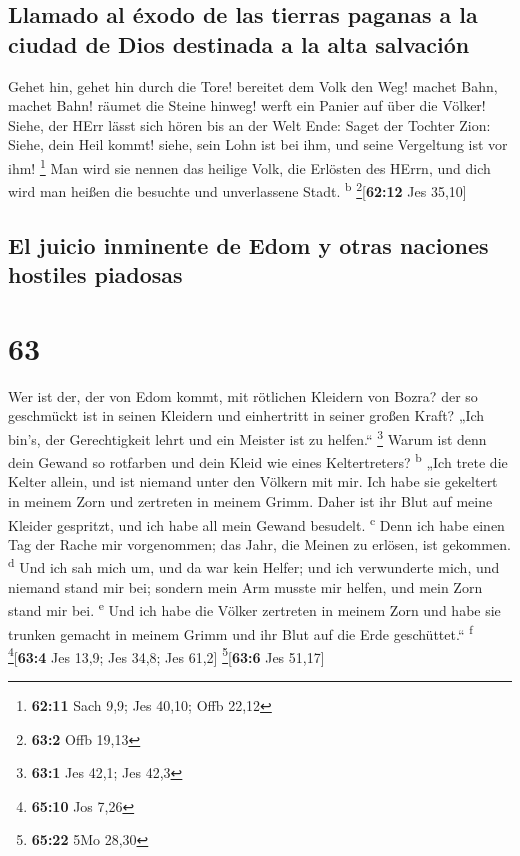 \hypertarget{llamado-al-uxe9xodo-de-las-tierras-paganas-a-la-ciudad-de-dios-destinada-a-la-alta-salvaciuxf3n}{%
\subsection{Llamado al éxodo de las tierras paganas a la ciudad de Dios
destinada a la alta
salvación}\label{llamado-al-uxe9xodo-de-las-tierras-paganas-a-la-ciudad-de-dios-destinada-a-la-alta-salvaciuxf3n}}

 Gehet hin, gehet hin durch die Tore! bereitet dem Volk
den Weg! machet Bahn, machet Bahn! räumet die Steine hinweg! werft ein
Panier auf über die Völker!  Siehe, der HErr lässt sich
hören bis an der Welt Ende: Saget der Tochter Zion: Siehe, dein Heil
kommt! siehe, sein Lohn ist bei ihm, und seine Vergeltung ist vor ihm!
\footnote{\textbf{62:11} Sach 9,9; Jes 40,10; Offb 22,12}
 Man wird sie nennen das heilige Volk, die Erlösten des
HErrn, und dich wird man heißen die besuchte und unverlassene Stadt.
\textsuperscript{b} \footnote{\textbf{63:2} Offb 19,13}{[}\textbf{62:12}
Jes 35,10{]}

\hypertarget{el-juicio-inminente-de-edom-y-otras-naciones-hostiles-piadosas}{%
\subsection{El juicio inminente de Edom y otras naciones hostiles
piadosas}\label{el-juicio-inminente-de-edom-y-otras-naciones-hostiles-piadosas}}

\hypertarget{section-62}{%
\section{63}\label{section-62}}

 Wer ist der, der von Edom kommt, mit rötlichen Kleidern
von Bozra? der so geschmückt ist in seinen Kleidern und einhertritt in
seiner großen Kraft? „Ich bin's, der Gerechtigkeit lehrt und ein Meister
ist zu helfen.`` \footnote{\textbf{63:1} Jes 42,1; Jes 42,3}
 Warum ist denn dein Gewand so rotfarben und dein Kleid
wie eines Keltertreters? \textsuperscript{b}  „Ich trete
die Kelter allein, und ist niemand unter den Völkern mit mir. Ich habe
sie gekeltert in meinem Zorn und zertreten in meinem Grimm. Daher ist
ihr Blut auf meine Kleider gespritzt, und ich habe all mein Gewand
besudelt. \textsuperscript{c}  Denn ich habe einen Tag der
Rache mir vorgenommen; das Jahr, die Meinen zu erlösen, ist gekommen.
\textsuperscript{d}  Und ich sah mich um, und da war kein
Helfer; und ich verwunderte mich, und niemand stand mir bei; sondern
mein Arm musste mir helfen, und mein Zorn stand mir bei.
\textsuperscript{e}  Und ich habe die Völker zertreten in
meinem Zorn und habe sie trunken gemacht in meinem Grimm und ihr Blut
auf die Erde geschüttet.`` \textsuperscript{f}
\footnote{\textbf{65:10} Jos 7,26}{[}\textbf{63:4} Jes 13,9; Jes 34,8;
Jes 61,2{]} \footnote{\textbf{65:22} 5Mo 28,30}{[}\textbf{63:6} Jes
51,17{]}

